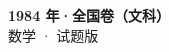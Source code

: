 \documentclass[zihao=-4, a4paper]{ctexart}
\begin{document}
\begin{center}
  {\Large\bfseries 1984 年·全国卷（文科）}\\[4pt]
  {\large 数学 · 试题版}
\end{center}
\medskip
{}

\end{document}

